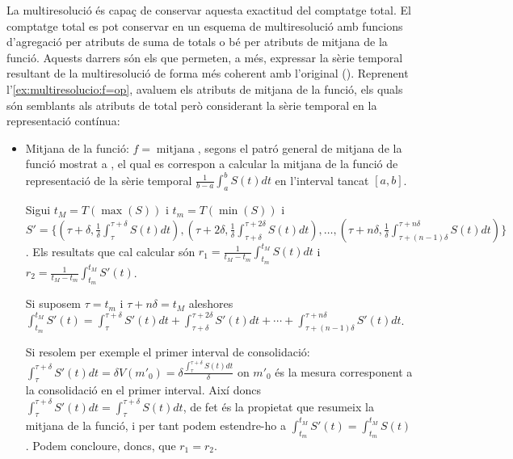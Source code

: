 La multiresolució és capaç de conservar aquesta exactitud del
comptatge total.  El comptatge total es pot conservar en un esquema de
multiresolució amb funcions d'agregació per atributs de suma de totals
o bé per atributs de mitjana de la funció. Aquests darrers són els que
permeten, a més, expressar la sèrie temporal resultant de la
multiresolució de forma més coherent amb l'original
(). Reprenent
l'\autoref{ex:multiresolucio:f=op}, avaluem els atributs de mitjana de
la funció, els quals són semblants als atributs de total però
considerant la sèrie temporal en la representació contínua:
  
  \begin{itemize}


  \item Mitjana de la funció: $f=\operatorname{mitjana}$, segons el
    patró general de mitjana de la funció mostrat a
    , el qual es correspon a calcular
    la mitjana de la funció de representació de la sèrie temporal
    $\frac{1}{b-a} \int_{a}^{b} S(t)dt$ en l'interval tancat $[a,b]$.

    Sigui $t_M=T(\max(S))$ i $t_m=T(\min(S))$ i $S'= \{
    (\tau+\delta, \frac{1}{\delta}
    \int_{\tau}^{\tau+\delta} S(t) dt), (\tau+2\delta,
     \frac{1}{\delta}\int_{\tau+\delta}^{\tau+2\delta} S(t) dt), \dotsc,
    (\tau+n\delta, \frac{1}{\delta}
    \int_{\tau+(n-1)\delta}^{\tau+n\delta} S(t) dt )\}$. %
    Els resultats que cal
    calcular són $r_1=\frac{1}{t_M-t_m} \int_{t_m}^{t_M} S(t)dt$ i
    $r_2 = \frac{1}{t_M-t_m} \int_{t_m}^{t_M} S'(t)$.

    Si suposem $\tau=t_m$ i $\tau+n\delta=t_M$ aleshores
    $\int_{t_m}^{t_M} S'(t) = \int_{\tau}^{\tau+\delta} S'(t) dt + \int_{\tau+\delta}^{\tau+2\delta} S'(t) dt + \dotsb + \int_{\tau+(n-1)\delta}^{\tau+n\delta}
    S'(t) dt$.  
    
    Si resolem per exemple el primer interval de consolidació: $
    \int_{\tau}^{\tau+\delta} S'(t) dt = \delta V(m'_0) =
    \delta \frac{ \int_{\tau}^{\tau+\delta} S(t)
      dt}{\delta}$ on $m'_0$ és la mesura corresponent a la
    consolidació en el primer interval. Així doncs
    $\int_{\tau}^{\tau+\delta} S'(t) dt =
    \int_{\tau}^{\tau+\delta} S(t) dt$, de fet és la propietat
    que resumeix la mitjana de la funció, i per tant podem estendre-ho
    a $\int_{t_m}^{t_M} S'(t)= \int_{t_m}^{t_M} S(t)$. Podem
    concloure, doncs, que $r_1=r_2$.



\end{itemize}
